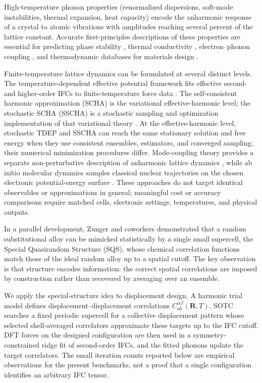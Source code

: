 \documentclass[aps,prb,reprint,amsmath,amssymb,floatfix]{revtex4-2}
\begin{document}
High-temperature phonon properties (renormalized dispersions, soft-mode
instabilities, thermal expansion, heat capacity) encode the anharmonic
response of a crystal to atomic vibrations with amplitudes reaching
several percent of the lattice constant. Accurate first-principles
descriptions of these properties are essential for predicting phase
stability \cite{ref1}, thermal conductivity \cite{ref2},
electron--phonon coupling \cite{ref3}, and thermodynamic databases for
materials design \cite{ref4}.

\color{revisionblue}
Finite-temperature lattice dynamics can be formulated at several distinct
levels. The temperature-dependent effective potential framework fits effective
second- and higher-order IFCs to finite-temperature force data
\cite{ref5,ref6,ref10,ref52}. The self-consistent harmonic approximation (SCHA)
is the variational effective-harmonic level; the stochastic SCHA (SSCHA) is a
stochastic sampling and optimization implementation of that variational theory
\cite{ref7,ref8,ref50}. At the effective-harmonic level, stochastic TDEP and
SSCHA can reach the same stationary solution and free energy when they use
consistent ensembles, estimators, and converged sampling; their numerical
minimization procedures differ. Mode-coupling theory provides a separate
non-perturbative description of anharmonic lattice dynamics \cite{ref51}, while
ab initio molecular dynamics samples classical nuclear trajectories on the
chosen electronic potential-energy surface \cite{ref9}. These approaches do not
target identical observables or approximations in general; meaningful cost or
accuracy comparisons require matched cells, electronic settings, temperatures,
and physical outputs.
\color{black}

In a parallel development, Zunger and coworkers \cite{ref12}
demonstrated that a random substitutional alloy can be mimicked
statistically by a single small supercell, the Special Quasirandom
Structure (SQS), whose chemical correlation functions match those of the
ideal random alloy up to a spatial cutoff. The key observation is that
structure encodes information: the correct spatial correlations are
imposed by construction rather than recovered by averaging over an
ensemble.

\color{revisionblue}
We apply the special-structure idea to displacement design. A harmonic trial
model defines displacement--displacement correlations
\(C_{ab}^{\alpha\beta}(\mathbf R,T)\). SOTC searches a fixed periodic
supercell for a collective displacement pattern whose selected shell-averaged
correlators approximate these targets up to the IFC cutoff. DFT forces on the
designed configuration are then used in a symmetry-constrained ridge fit of
second-order IFCs, and the fitted phonons update the target correlators. The
small iteration counts reported below are empirical observations for the
present benchmarks, not a proof that a single configuration identifies an
arbitrary IFC tensor.
\color{black}
\end{document}
